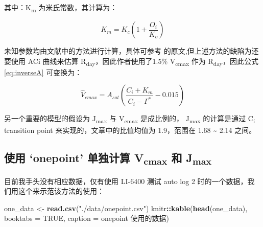 \documentclass[
]{krantz}
\makeatletter
\newenvironment{Shaded}{\begin{snugshade}}{\end{snugshade}}
\newcommand{\DataTypeTok}[1]{\textcolor[rgb]{0.13,0.29,0.53}{#1}}
\newcommand{\KeywordTok}[1]{\textcolor[rgb]{0.13,0.29,0.53}{\textbf{#1}}}
\newcommand{\NormalTok}[1]{#1}
\newcommand{\OperatorTok}[1]{\textcolor[rgb]{0.81,0.36,0.00}{\textbf{#1}}}
\newcommand{\OtherTok}[1]{\textcolor[rgb]{0.56,0.35,0.01}{#1}}
\newcommand{\StringTok}[1]{\textcolor[rgb]{0.31,0.60,0.02}{#1}}
\newenvironment{kframe}{%
\medskip{}
\setlength{\fboxsep}{.8em}
 \def\at@end@of@kframe{}%
 \ifinner\ifhmode%
  \def\at@end@of@kframe{\end{minipage}}%
  \begin{minipage}{\columnwidth}%
 \fi\fi%
 \def\FrameCommand##1{\hskip\@totalleftmargin \hskip-\fboxsep
 \colorbox{shadecolor}{##1}\hskip-\fboxsep
     \hskip-\linewidth \hskip-\@totalleftmargin \hskip\columnwidth}%
 \MakeFramed {\advance\hsize-\width
   \@totalleftmargin\z@ \linewidth\hsize
   \@setminipage}}%
 {\par\unskip\endMakeFramed%
 \at@end@of@kframe}
\renewenvironment{Shaded}{\begin{kframe}}{\end{kframe}}
\makeatother
\begin{document}
其中：K\textsubscript{m} 为米氏常数，其计算为：

\begin{equation}
K_m = K_c (1 + \frac{O_i}{K_o}) 
\label{eq:km}
\end{equation}

未知参数均由文献中的方法进行计算，具体可参考 \citet{De2016A} 的原文,但上述方法的缺陷为还要使用 ACi 曲线来估算 R\textsubscript{day}，因此作者使用了1.5\% V\textsubscript{cmax} 作为 R\textsubscript{day}，因此公式 \eqref{eq:inverseA} 可变换为：

\begin{equation}
\hat{V}_{cmax} = A_{sat} (\frac{C_i + K_m}{C_i - \Gamma^*} - 0.015)
\label{eq:onepoint}
\end{equation}

另一个重要的模型的假设为 J\textsubscript{max} 与 V\textsubscript{cmax} 是成比例的， J\textsubscript{max} 的计算是通过 C\textsubscript{i} transition point 来实现的，文章中的比值均值为 1.9，范围在 1.68 \textasciitilde{} 2.14 之间。

\hypertarget{onpoint_fit}{%
\subsection{\texorpdfstring{使用 `onepoint' 单独计算 V\textsubscript{cmax} 和 J\textsubscript{max}}{使用 `onepoint' 单独计算 Vcmax 和 Jmax}}\label{onpoint_fit}}

目前我手头没有相应数据，仅有使用 LI-6400 测试 auto log 2 时的一个数据，我们用这个来示范该方法的使用：

\begin{Shaded}
\begin{Highlighting}[]
\NormalTok{one\_data \textless{}{-}}\StringTok{ }\KeywordTok{read.csv}\NormalTok{(}\StringTok{"./data/onepoint.csv"}\NormalTok{)}
\NormalTok{knitr}\OperatorTok{::}\KeywordTok{kable}\NormalTok{(}\KeywordTok{head}\NormalTok{(one\_data), }\DataTypeTok{booktabs =} \OtherTok{TRUE}\NormalTok{,}
             \DataTypeTok{caption =} \StringTok{\textquotesingle{}onepoint 使用的数据\textquotesingle{}}\NormalTok{)}
\end{Highlighting}
\end{Shaded}
\end{document}
